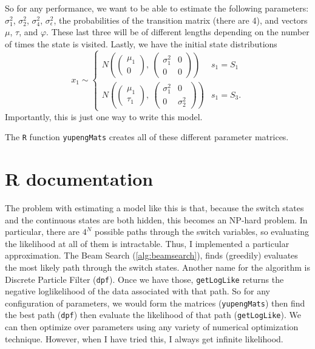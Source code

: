 \documentclass[11pt]{article}
\begin{document}
So for any performance, we want to be able to estimate
the following parameters: $\sigma_1^2$, $\sigma_2^2$, $\sigma^2_4$,
$\sigma_\epsilon^2$, the probabilities of the transition matrix (there
are 4), and vectors $\mu$, $\tau$, and $\varphi$. These last three
will be of different lengths depending on the number of times the
state is visited. Lastly, we have the initial state distributions
\[
x_1\sim\begin{cases} N\left( \begin{pmatrix}\mu_1\\0\end{pmatrix}
  ,\ \begin{pmatrix} \sigma^2_1 & 0\\0 & 0
  \end{pmatrix}\right) & s_1=S_1\\
N\left( \begin{pmatrix}\mu_1\\\tau_1\end{pmatrix}
  ,\ \begin{pmatrix} \sigma^2_1 & 0\\0 & \sigma^2_2
  \end{pmatrix}\right) & s_1=S_3.\end{cases}
\]
Importantly, this is just one way to write this
model.

The \texttt{R} function
\texttt{yupengMats} creates all of these different parameter matrices.


\section{R documentation}

The problem with estimating a model like this is that, because the
switch states and the continuous states are both hidden, this becomes
an NP-hard problem. In particular, there are $4^N$ possible paths
through the switch variables, so evaluating the likelihood at all of
them is intractable. Thus, I implemented a particular
approximation. The Beam Search (\autoref{alg:beamsearch}), finds
(greedily) evaluates the most likely path through the switch
states. Another name for the algorithm is Discrete Particle Filter
(\texttt{dpf}). Once we have those, \texttt{getLogLike} returns the
negative 
loglikelihood of the data associated with that path. So for any
configuration of parameters, we would form the matrices
(\texttt{yupengMats}) then find the best path (\texttt{dpf}) then
evaluate the likelihood of that path (\texttt{getLogLike}). We can
then optimize over parameters using any variety of numerical
optimization technique. However, when I have tried this, I always get
infinite likelihood.
\end{document}
